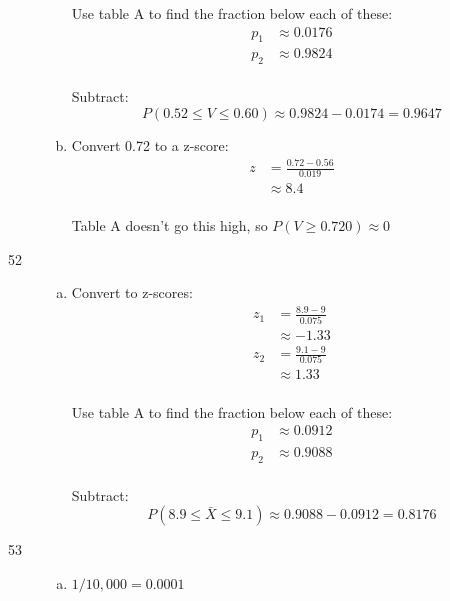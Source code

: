 \documentclass[letterpaper]{exam}
\begin{document}
\begin{description}
\begin{enumerate}[(a)]
            Use table A to find the fraction below each of these:
            \begin{align*}
              p_1 &\approx 0.0176 \\
              p_2 &\approx 0.9824 \\
            \end{align*}

            Subtract:
            \[
              P(0.52 \leq V \leq 0.60) \approx 0.9824 - 0.0174 = \boxed{ 0.9647 }
            \]

          \item Convert 0.72 to a z-score:
            \begin{align*}
              z & = \frac{0.72 - 0.56}{0.019} \\
                & \approx 8.4 \\
            \end{align*}

            Table A doesn't go this high, so $P(V \geq 0.720) \approx 0$
        \end{enumerate}  

      \item[52]
        \begin{enumerate}[(a)]
          \item Convert to z-scores:
            \begin{align*}
              z_1 & = \frac{8.9 - 9}{0.075} \\
                  & \approx -1.33 \\
              z_2 & = \frac{9.1 - 9}{0.075} \\
                  & \approx 1.33 \\
            \end{align*}

            Use table A to find the fraction below each of these:
            \begin{align*}
              p_1 &\approx 0.0912 \\
              p_2 &\approx 0.9088 \\
            \end{align*}

            Subtract:
            \[
              P(8.9 \leq \bar{X} \leq 9.1) \approx 0.9088 - 0.0912 = \boxed{ 0.8176 }
            \]
          \end{enumerate}

        \item[53]
          \begin{enumerate}[(a)]
            \item $1/10,000 = \boxed{ 0.0001 }$


\end{enumerate}
\end{description}
\end{document}
